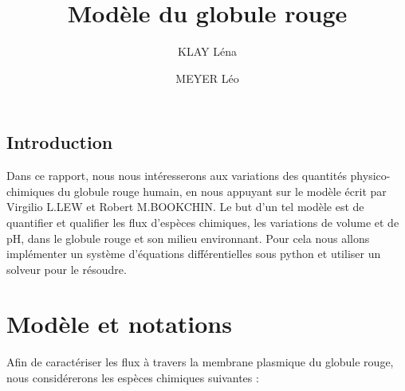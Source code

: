 \documentclass[a4paper,fleqn]{article}
\title{Modèle du globule rouge}           %
\author{KLAY Léna \and MEYER Léo}
\date{}                       %
\begin{document}
\maketitle                    %


\subsection*{Introduction}

Dans ce rapport, nous nous intéresserons aux variations des quantités physico-chimiques  du globule rouge humain, en nous appuyant sur le modèle écrit par Virgilio L.LEW et Robert M.BOOKCHIN. Le but d'un tel modèle est de quantifier et qualifier les flux d'espèces chimiques, les variations de volume et de pH, dans le globule rouge et son milieu environnant. Pour cela nous allons implémenter un système d'équations différentielles sous python et utiliser un solveur pour le résoudre.


\tableofcontents              %


\section{Modèle et notations}               %

Afin de caractériser les flux à travers la membrane plasmique du globule rouge, nous considérerons les espèces chimiques suivantes :
\end{document}
